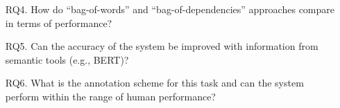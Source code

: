 \documentclass[xcolor={dvipsnames}]{beamer}
\begin{document}
\begin{frame}
\begin{itemize}
\pause
\vspace{1em}
\item[RQ4.]{How do ``bag-of-words'' and ``bag-of-dependencies'' approaches compare in terms of performance?}
\pause
\vspace{1em}
\item[RQ5.]{Can the accuracy of the system be improved with information from semantic tools (e.g., BERT)?}

\pause
\vspace{1em}
\item[RQ6.]{What is the annotation scheme for this task and can the system perform within the range of human performance?}
\end{itemize}
\end{frame}
\end{document}
